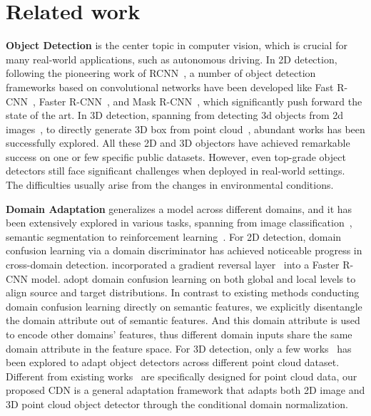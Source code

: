 \documentclass[runningheads]{llncs}
\begin{document}
\section{Related work} \label{gen_inst}

\textbf{Object Detection} is the center topic in computer vision, which
is crucial for many real-world applications, such as autonomous driving.
In 2D detection, following the pioneering work of RCNN~\cite{girshick2014rich}, a number of object detection frameworks based
on convolutional networks have been developed like Fast R-CNN~\cite{girshick2015fast}, Faster R-CNN~\cite{ren2015faster}, and Mask R-CNN~\cite{he2017mask}, which significantly push forward the state of the art.
In 3D detection, spanning from detecting 3d objects from 2d images~\cite{chen20153d}, to directly generate 3D box from point cloud~\cite{qi2017pointnet++,shi2019pointrcnn}, abundant works has been successfully explored.
All these 2D and 3D objectors have achieved remarkable success on one or few specific public datasets.
However, even top-grade object detectors still face significant challenges when deployed in real-world settings.
The difficulties usually arise from the changes in environmental conditions.


\noindent \textbf{Domain Adaptation}
generalizes a model across different domains, and it has been extensively explored in various tasks, spanning from image  classification~\cite{bousmalis2017unsupervised,tzeng2017adversarial,long2018conditional,Peng_2019_ICCV,Liu_2020_CVPR}, semantic segmentation \cite{hoffman2017cycada,tsai2019domain,sankaranarayanan2018learning} to reinforcement learning~\cite{tobin2017domain,peng2018sim,james2019sim}.
For 2D detection, domain confusion learning via a domain discriminator has achieved noticeable progress in cross-domain detection.
\cite{chen2018domain} incorporated a gradient reversal layer~\cite{ganin2015unsupervised} into a Faster R-CNN model.
\cite{Saito_2019_CVPR,Zhu_2019_CVPR} adopt domain confusion learning on both global and local levels to align source and target distributions.
In contrast to existing methods conducting domain confusion learning directly on semantic features,
we explicitly disentangle the domain attribute out of semantic features.
And this domain attribute is used to encode other domains' features, thus different domain inputs share the same domain attribute in the feature space.
For 3D detection,
only a few works~\cite{yue2018lidar,hurl2019precise} has been explored to adapt object detectors across different point cloud dataset.
Different from existing works~\cite{yue2018lidar,hurl2019precise} are specifically designed for point cloud data, our proposed CDN is a general adaptation framework that adapts both 2D image and 3D point cloud object detector through the conditional domain normalization.
\end{document}

